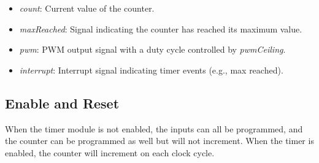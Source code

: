 \begin{itemize}[noitemsep]
    \item{\textit{count}: Current value of the counter.}
    \item{\textit{maxReached}: Signal indicating the counter has reached its maximum value.}
    \item{\textit{pwm}: PWM output signal with a duty cycle controlled by \textit{pwmCeiling}.}
    \item{\textit{interrupt}: Interrupt signal indicating timer events (e.g., max reached).}
\end{itemize}

\subsection{Enable and Reset}
When the timer module is not enabled, the inputs can all be programmed,
and the counter can be programmed as well but will not increment.
When the timer is enabled, the counter will increment on each clock cycle.